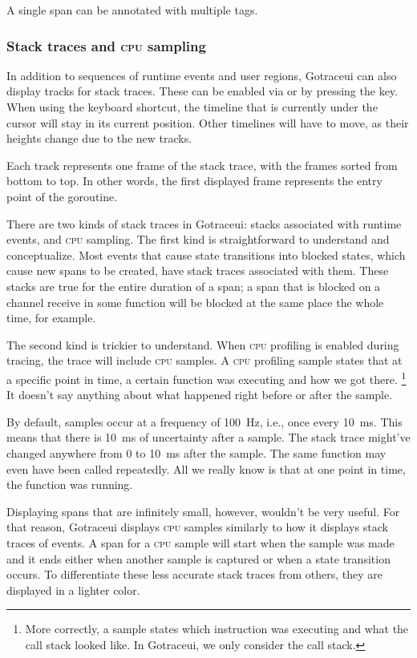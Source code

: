 \documentclass[10pt,letterpaper,oneside,openany,english]{memoir}
\begin{document}
A single span can be annotated with multiple tags.


\subsubsection{Stack traces and \textsc{cpu} sampling}\label{cpu-sampling}
In addition to sequences of runtime events and user regions, Gotraceui can also display tracks for stack traces.
These can be enabled via  or by pressing the  key.
When using the keyboard shortcut, the timeline that is currently under the cursor will stay in its current position.
Other timelines will have to move, as their heights change due to the new tracks.

Each track represents one frame of the stack trace, with the frames sorted from bottom to top.
In other words, the first displayed frame represents the entry point of the goroutine.

There are two kinds of stack traces in Gotraceui: stacks associated with runtime events, and \textsc{cpu} sampling.
The first kind is straightforward to understand and conceptualize.
Most events that cause state transitions into blocked states, which cause new spans to be created, have stack traces associated with them.
These stacks are true for the entire duration of a span;
a span that is blocked on a channel receive in some function will be blocked at the same place the whole time, for example.

The second kind is trickier to understand. When \textsc{cpu} profiling is enabled during tracing, the trace will include \textsc{cpu} samples.
A \textsc{cpu} profiling sample states that at a specific point in time, a certain function was executing and how we got there.%
\footnote{More correctly, a sample states which instruction was executing and what the call stack looked like.
  In Gotraceui, we only consider the call stack.}
It doesn't say anything about what happened right before or after the sample.

By default, samples occur at a frequency of \qty{100}{\hertz}, i.e., once every \qty{10}{\milli\second}.
This means that there is \qty{10}{\milli\second} of uncertainty after a sample.
The stack trace might've changed anywhere from \num{0} to \qty{10}{\milli\second} after the sample.
The same function may even have been called repeatedly.
All we really know is that at one point in time, the function was running.

Displaying spans that are infinitely small, however, wouldn't be very useful.
For that reason, Gotraceui displays \textsc{cpu} samples similarly to how it displays stack traces of events.
A span for a \textsc{cpu} sample will start when the sample was made and it ends either when another sample is captured or when a state transition occurs.
To differentiate these less accurate stack traces from others, they are displayed in a lighter color.
\end{document}
